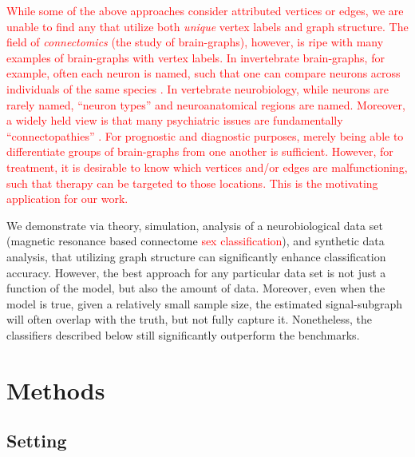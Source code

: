 \documentclass[10pt,journal,cspaper,compsoc]{IEEEtran}
\providecommand{\tr}[1]{\textcolor{red}{#1}}
\begin{document}
\tr{While some of the above approaches consider attributed vertices or edges, we are unable to find any that utilize both \emph{unique} vertex labels and graph structure. The field of \emph{connectomics} (the study of brain-graphs), however, is ripe with many examples of brain-graphs with vertex labels.  In invertebrate brain-graphs, for example, often each neuron is named, such that one can compare neurons across individuals of the same species \cite{North2007}.  In vertebrate neurobiology, while neurons are rarely named, ``neuron types''  \cite{Shepherd2007} and neuroanatomical regions \cite{Nolte2002} are named.  Moreover, a widely held view is that many psychiatric issues are fundamentally ``connectopathies'' \cite{LichtmanSanes08, Bassett2009}.  For prognostic and diagnostic purposes, merely being able to differentiate groups of brain-graphs from one another is sufficient.  However, for treatment, it is desirable to know which vertices and/or edges are malfunctioning, such that therapy can be targeted to those locations. This is the motivating application for our work.}

We demonstrate via theory, simulation, analysis of a neurobiological data set (magnetic resonance based connectome \tr{sex classification}), and synthetic data analysis, that utilizing graph structure can significantly enhance classification accuracy.  However, the best approach for any particular data set is not just a function of the model, but also the amount of data.  Moreover, even when the model is true, given a relatively small sample size, the estimated signal-subgraph will often overlap with the truth, but not fully capture it.  Nonetheless, the classifiers described below still significantly outperform the benchmarks.

\section{Methods} %
\label{sec:methods}




\subsection{Setting}
\end{document}
